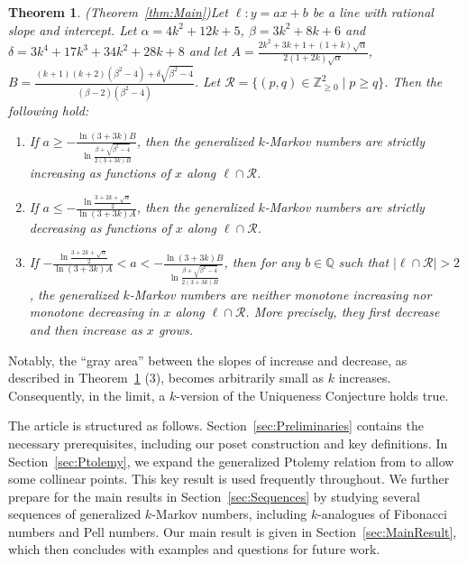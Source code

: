 \documentclass{article}
\newtheorem{theorem}{Theorem}
\theoremstyle{remark}
\begin{document}
\begin{theorem}(Theorem~\ref{thm:Main})\label{thm:Main-intro}
Let $\ell:y=ax+b$ be a line with rational slope and intercept. Let $\alpha = 4k^2 + 12k + 5$, $\beta= 3k^2 + 8k + 6$ and $\delta= 3k^4 + 17k^3 + 34 k^2 + 28k + 8$  and let $A= \frac{2k^2 + 3k + 1 + (1+k)\sqrt{\alpha}}{2(1+2k)\sqrt{\alpha}}$, $B=\frac{(k+1)(k+2)(\beta^2-4)+\delta\sqrt{\beta^2-4}}{(\beta-2)(\beta^2-4)}$. Let $ \mathcal R=\{(p,q)\in \mathbb Z_{\geq0}^2\mid p\geq q\}$. Then the following hold:
\begin{enumerate}
    \item[$(1)$] If $a \geq -\frac{\ln(3+3k)B}{\ln\frac{\beta+\sqrt{\beta^2-4}}{2(3+3k)B}}$,
    then the generalized $k$-Markov numbers are strictly increasing as functions of $x$ along $\ell\cap \mathcal R$. 

    \item[$(2)$] If $a\leq -\frac{\ln\frac{3+2k+\sqrt{\alpha}}{2}}{\ln(3+3k)A}$,
    then the generalized $k$-Markov numbers are strictly decreasing as functions of $x$ along $\ell\cap \mathcal R$. 

    \item[$(3)$] If $-\frac{\ln\frac{3+2k+\sqrt{\alpha}}{2}}{\ln(3+3k)A}< a<-\frac{\ln(3+3k)B}{\ln\frac{\beta+\sqrt{\beta^2-4}}{2(3+3k)B}}$, then for any 
    $b\in \mathbb Q$ such that $|\ell\cap \mathcal R|>2$,
    the generalized $k$-Markov numbers are neither monotone increasing nor monotone decreasing in $x$ along $\ell\cap \mathcal R$. More precisely, they first decrease and then increase as $x$ grows.
\end{enumerate}
\end{theorem}

Notably, the ``gray area'' between the slopes of increase and decrease, as described in Theorem~\ref{thm:Main-intro} (3), becomes arbitrarily small as $k$ increases. Consequently, in the limit, a $k$-version of the Uniqueness Conjecture holds true.

The article is structured as follows. Section~\ref{sec:Preliminaries} contains the necessary prerequisites, including our poset construction and key definitions. In Section~\ref{sec:Ptolemy}, we expand the generalized Ptolemy relation from \cite{banaian2025} to allow some collinear points. This key result is used frequently throughout. We further prepare for the main results in  Section~\ref{sec:Sequences} by studying several sequences of generalized $k$-Markov numbers, including $k$-analogues of Fibonacci numbers and Pell numbers. Our main result is given in Section~\ref{sec:MainResult}, which then concludes with examples and questions for future work. 
\end{document}
